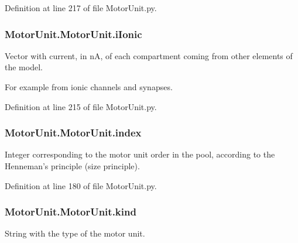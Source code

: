 Definition at line 217 of file Motor\-Unit.\-py.

\hypertarget{class_motor_unit_1_1_motor_unit_a0541858216e7d01582312f9a7a99d595}{
\subsubsection[{i\-Ionic}]{\setlength{\rightskip}{0pt plus 5cm}Motor\-Unit.\-Motor\-Unit.\-i\-Ionic}}\label{class_motor_unit_1_1_motor_unit_a0541858216e7d01582312f9a7a99d595}


Vector with current, in n\-A, of each compartment coming from other elements of the model. 

For example from ionic channels and synapses. 

Definition at line 215 of file Motor\-Unit.\-py.

\hypertarget{class_motor_unit_1_1_motor_unit_a4f3205a9273aabb92d425992d91a1848}{
\subsubsection[{index}]{\setlength{\rightskip}{0pt plus 5cm}Motor\-Unit.\-Motor\-Unit.\-index}}\label{class_motor_unit_1_1_motor_unit_a4f3205a9273aabb92d425992d91a1848}


Integer corresponding to the motor unit order in the pool, according to the Henneman's principle (size principle). 



Definition at line 180 of file Motor\-Unit.\-py.

\hypertarget{class_motor_unit_1_1_motor_unit_a08ed5171ba46e0b1ea5bc7d08296c612}{
\subsubsection[{kind}]{\setlength{\rightskip}{0pt plus 5cm}Motor\-Unit.\-Motor\-Unit.\-kind}}\label{class_motor_unit_1_1_motor_unit_a08ed5171ba46e0b1ea5bc7d08296c612}


String with the type of the motor unit. 

